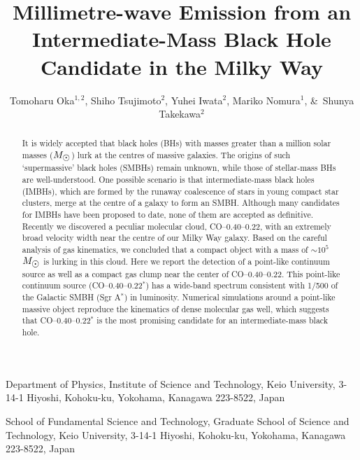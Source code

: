 \documentclass{nature}
\title{Millimetre-wave Emission from an Intermediate-Mass Black Hole Candidate in the Milky Way}
\author{Tomoharu Oka$^{1,2}$, Shiho Tsujimoto$^2$, Yuhei Iwata$^2$, Mariko Nomura$^1$, \&\ Shunya Takekawa$^2$}
\def\sun{\hbox{$\odot$}}
\begin{document}
\maketitle

\begin{affiliations}
\item Department of Physics, Institute of Science and Technology, Keio University, 3-14-1 Hiyoshi, Kohoku-ku, Yokohama, Kanagawa 223-8522, Japan
\item School of Fundamental Science and Technology, Graduate School of Science and Technology, Keio University, 3-14-1 Hiyoshi, Kohoku-ku, Yokohama, Kanagawa 223-8522, Japan
\end{affiliations}

\begin{abstract}
It is widely accepted that black holes (BHs) with masses greater than a million solar masses ($M_{\sun}$) lurk at the centres of massive galaxies. The origins of such `supermassive' black holes (SMBHs) remain unknown\cite{Djorgovski99}, while those of stellar-mass BHs are well-understood. One possible scenario is that intermediate-mass black holes (IMBHs), which are formed by the runaway coalescence of stars in young compact star clusters\cite{Portegies99}, merge at the centre of a galaxy to form an SMBH\cite{Ebisuzaki01}. Although many candidates for IMBHs have been proposed to date, none of them are accepted as definitive. Recently we discovered a peculiar molecular cloud, CO--0.40--0.22, with an extremely broad velocity width near the centre of our Milky Way galaxy. Based on the careful analysis of gas kinematics, we concluded that a compact object with a mass of $\sim\!10^5$ $M_{\sun}$ is lurking in this cloud\cite{Oka16}. Here we report the detection of a point-like continuum source as well as a compact gas clump near the center of CO--0.40--0.22. This point-like continuum source (CO--0.40--0.22$^*$) has a wide-band spectrum consistent with 1/500 of the Galactic SMBH (Sgr A$^*$) in luminosity. Numerical simulations around a point-like massive object reproduce the kinematics of dense molecular gas well, which suggests that CO--0.40--0.22$^*$ is the most promising candidate for an intermediate-mass black hole.
\end{abstract}

\end{document}
